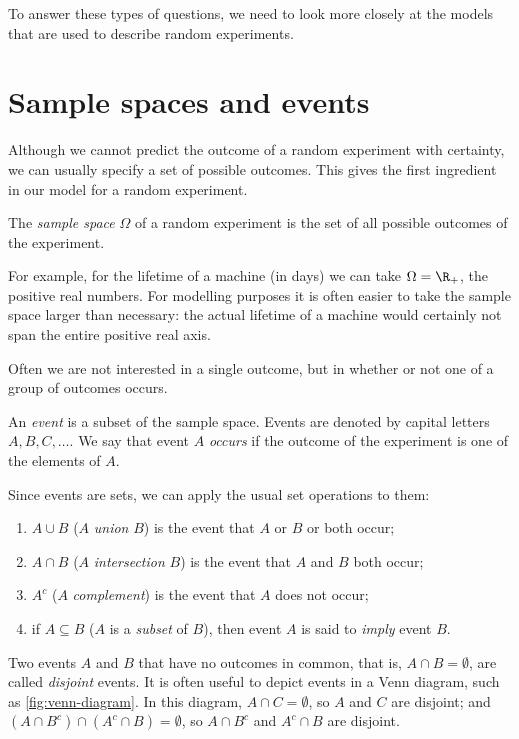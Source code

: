 To answer these types of questions, we need to look more closely at the models that are used to describe random experiments.

\section{Sample spaces and events}\label{sec:sample-spaces-events}

Although we cannot predict the outcome of a random experiment with certainty, we can usually specify a set of possible outcomes. This gives the first ingredient in our model for a random experiment.

\begin{definition}\label{def:sample-space}
The \emph{sample space} $\Omega$ of a random experiment is the set of all possible outcomes of the experiment.
\end{definition}

For example, for the lifetime of a machine (in days) we can take $\Omega = \R_+$, the positive real numbers. For modelling purposes it is often easier to take the sample space larger than necessary: the actual lifetime of a machine would certainly not span the entire positive real axis.

Often we are not interested in a single outcome, but in whether or not one of a group of outcomes occurs.

\begin{definition}[Event]\label{def:event}
An \emph{event} is a subset of the sample space. Events are denoted by capital letters $A, B, C, \ldots$. We say that event $A$ \emph{occurs} if the outcome of the experiment is one of the elements of $A$.
\end{definition}

Since events are sets, we can apply the usual set operations to them:
\begin{enumerate}
  \item $A \cup B$ ($A$ \emph{union} $B$) is the event that $A$ or $B$ or both occur;
  \item $A \cap B$ ($A$ \emph{intersection} $B$) is the event that $A$ and $B$ both occur;
  \item $A^c$ ($A$ \emph{complement}) is the event that $A$ does not occur;
  \item if $A \subseteq B$ ($A$ is a \emph{subset} of $B$), then event $A$ is said to \emph{imply} event $B$.
\end{enumerate}
Two events $A$ and $B$ that have no outcomes in common, that is, $A \cap B = \emptyset$, are called \emph{disjoint} events. It is often useful to depict events in a Venn diagram, such as \cref{fig:venn-diagram}. In this diagram, $A \cap C = \emptyset$, so $A$ and $C$ are disjoint; and $(A \cap B^c) \cap (A^c \cap B) = \emptyset$, so $A \cap B^c$ and $A^c \cap B$ are disjoint.


